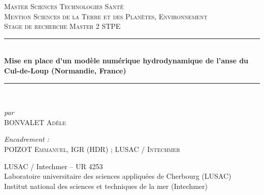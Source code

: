 \documentclass[10pt,a4paper,titlepage]{article}
\newcommand{\HRule}{\rule{\linewidth}{0.5mm}}
\begin{document}
    \begin{titlepage}
        \begin{sffamily}
            \begin{center}


                \textsc{\LARGE Master Sciences Technologies Santé\\
                    Mention Sciences de la Terre et des Planètes, Environnement}\\[2cm]

                \textsc{\Large Stage de recherche Master 2 STPE}\\[1.5cm]

                \HRule \\[0.4cm]
                { \huge \bfseries Mise en place d’un modèle numérique hydrodynamique de l’anse du Cul-de-Loup (Normandie, France)\\ [0.4cm] }

                \HRule \\[2cm]

                \begin{flushleft} \large
                    \centering
                    \emph{par}\\ \textsc{BONVALET Adèle}\\
                \end{flushleft}
                
                \vfill
                
                \begin{flushleft} \large
                    \emph{Encadrement :} \\ \textsc{POIZOT Emmanuel, IGR (HDR) ; LUSAC / Intechmer}\\
                \end{flushleft}
\vspace{1cm}
{\large LUSAC / Intechmer  – UR 4253
    \\Laboratoire universitaire des sciences appliquées de Cherbourg (LUSAC)
    \\Institut national des sciences et techniques de la mer (Intechmer)
}
\\[2cm]


\end{center}
\end{sffamily}
\end{titlepage}
\end{document}

